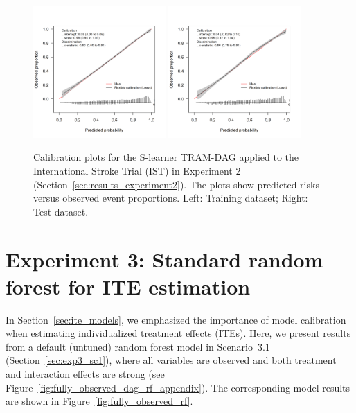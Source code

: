 \begin{figure}[htbp]
\centering
\includegraphics[width=0.45\textwidth]{img/results_IST/IST_TRAM_DAG_slearner_train_calibration_plot.png}
\includegraphics[width=0.45\textwidth]{img/results_IST/IST_TRAM_DAG_slearner_test_calibration_plot.png}
\caption{Calibration plots for the S-learner TRAM-DAG applied to the International Stroke Trial (IST) in Experiment 2 (Section~\ref{sec:results_experiment2}). The plots show predicted risks versus observed event proportions. Left: Training dataset; Right: Test dataset.}
\label{fig:calibration_IST_TRAM_DAG}
\end{figure}


\clearpage


\section{Experiment 3: Standard random forest for ITE estimation} \label{sec:default_rf_ite}

In Section~\ref{sec:ite_models}, we emphasized the importance of model calibration when estimating individualized treatment effects (ITEs). Here, we present results from a default (untuned) random forest model in Scenario~3.1 (Section~\ref{sec:exp3_sc1}), where all variables are observed and both treatment and interaction effects are strong (see Figure~\ref{fig:fully_observed_dag_rf_appendix}). The corresponding model results are shown in Figure~\ref{fig:fully_observed_rf}.

